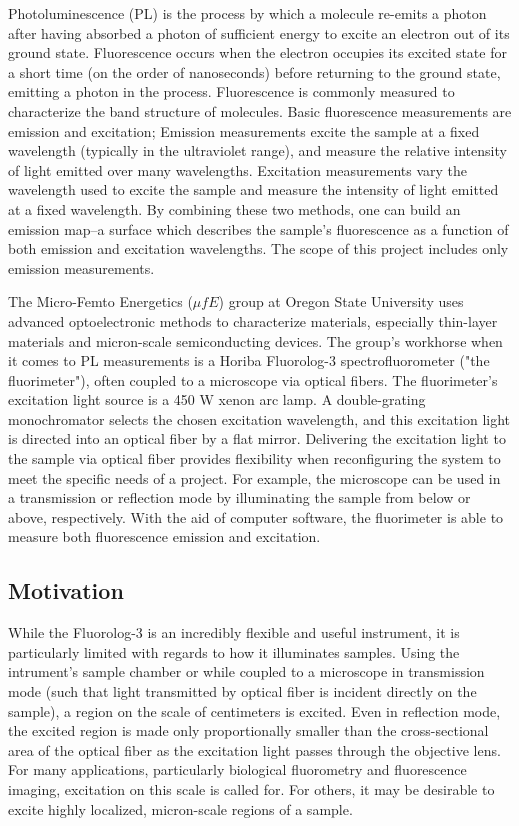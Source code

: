 Photoluminescence (PL) is the process by which a molecule re-emits a photon after having absorbed a photon of sufficient energy to excite an electron out of its ground state. Fluorescence occurs when the electron occupies its excited state for a short time (on the order of nanoseconds) before returning to the ground state, emitting a photon in the process. Fluorescence is commonly measured to characterize the band structure of molecules. Basic fluorescence measurements are emission and excitation; Emission measurements excite the sample at a fixed wavelength (typically in the ultraviolet range), and measure the relative intensity of light emitted over many wavelengths. Excitation measurements vary the wavelength used to excite the sample and measure the intensity of light emitted at a fixed wavelength. By combining these two methods, one can build an emission map--a surface which describes the sample's fluorescence as a function of both emission and excitation wavelengths. The scope of this project includes only emission measurements.

The Micro-Femto Energetics ($\mu fE$) group at Oregon State University uses advanced optoelectronic methods to characterize materials, especially thin-layer materials and micron-scale semiconducting devices. The group's workhorse when it comes to PL measurements is a Horiba Fluorolog-3 spectrofluorometer ("the fluorimeter"), often coupled to a microscope via optical fibers. The fluorimeter's excitation light source is a 450 W xenon arc lamp. A double-grating monochromator selects the chosen excitation wavelength, and this excitation light is directed into an optical fiber by a flat mirror. Delivering the excitation light to the sample via optical fiber provides flexibility when reconfiguring the system to meet the specific needs of a project. For example, the microscope can be used in a transmission or reflection mode by illuminating the sample from below or above, respectively. With the aid of computer software, the fluorimeter is able to measure both fluorescence emission and excitation.

\subsection{Motivation}
While the Fluorolog-3 is an incredibly flexible and useful instrument, it is particularly limited with regards to how it illuminates samples. Using the intrument's sample chamber or while coupled to a microscope in transmission mode (such that light transmitted by optical fiber is incident directly on the sample), a region on the scale of centimeters is excited. Even in reflection mode, the excited region is made only proportionally smaller than the cross-sectional area of the optical fiber as the excitation light passes through the objective lens. For many applications, particularly biological fluorometry and fluorescence imaging, excitation on this scale is called for. For others, it may be desirable to excite highly localized, micron-scale regions of a sample.


